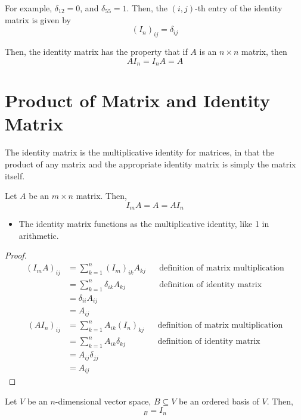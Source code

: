 \documentclass[letterpaper,12pt]{article}
\begin{document}
For example, $\delta_{12} = 0$, and $\delta_{55} = 1$. Then, the $(i,j)$-th entry of the identity matrix is given by
\begin{equation*}
    (I_n)_{ij} = \delta_{ij}
\end{equation*}

Then, the identity matrix has the property that if $A$ is an $n \times n$ matrix, then
\begin{equation*}
    AI_n = I_n A = A
\end{equation*}

\section*{Product of Matrix and Identity Matrix}
The identity matrix is the multiplicative identity for matrices, in that the product of any matrix and the appropriate identity matrix is simply the matrix itself.
\begin{theorem}
Let $A$ be an $m \times n$ matrix. Then,
\begin{equation*}
    I_m A = A = AI_n
\end{equation*}
\begin{itemize}
    \item The identity matrix functions as the multiplicative identity, like 1 in arithmetic.
\end{itemize}
\end{theorem}
\begin{proof}
\begin{align*}
    (I_m A)_{ij} & = \sum_{k=1}^n (I_m)_{ik} A_{kj} && \text{definition of matrix multiplication} \\
    & = \sum_{k=1}^n \delta_{ik} A_{kj} && \text{definition of identity matrix} \\
    & = \delta_{ii} A_{ij} \\
    & = A_{ij}
\end{align*}
\begin{align*}
    (A I_n)_{ij} & = \sum_{k=1}^n A_{ik} (I_n)_{kj} && \text{definition of matrix multiplication} \\
    & = \sum_{k=1}^n A_{ik} \delta_{kj} && \text{definition of identity matrix} \\
    & = A_{ij} \delta_{jj} \\
    & = A_{ij}
\end{align*}
\end{proof}

\begin{theorem}
Let $V$ be an $n$-dimensional vector space, $B \subseteq V$ be an ordered basis of $V$. Then,
\begin{equation*}
    [\operatorname{Id}_{V}]_{B} = I_n
\end{equation*}
\end{theorem}
\end{document}
